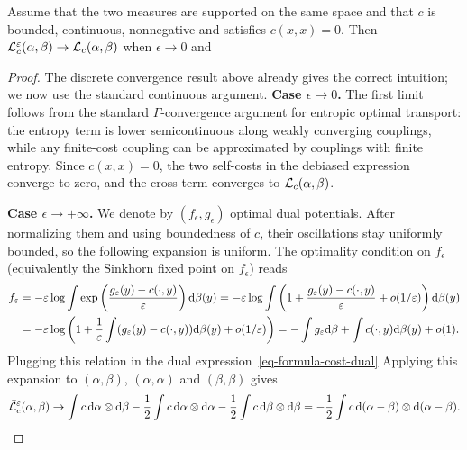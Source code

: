\begin{prop}\label{prop-sinkhorn-divergence-asymptotics}
	Assume that the two measures are supported on the same space and that $c$ is bounded, continuous, nonnegative and satisfies $c(x,x)=0$.
	Then $\bar{\mathcal{L}}_c^\varepsilon(\alpha,\beta) \rightarrow \mathcal{L}_c(\alpha,\beta)$ when $\epsilon\rightarrow 0$ and
\end{prop}
\begin{proof}
	The discrete convergence result above already gives the correct intuition; we now use the standard continuous argument.
	\textbf{Case $\epsilon \rightarrow 0$.}
	The first limit follows from the standard $\Gamma$-convergence argument for entropic optimal transport: the entropy term is lower semicontinuous along weakly converging couplings, while any finite-cost coupling can be approximated by couplings with finite entropy. Since $c(x,x)=0$, the two self-costs in the debiased expression converge to zero, and the cross term converges to $\mathcal{L}_c(\alpha,\beta)$.

	\textbf{Case $\epsilon \rightarrow +\infty$.} We denote by $(f_\epsilon,g_\epsilon)$ optimal dual potentials. After normalizing them and using boundedness of $c$, their oscillations stay uniformly bounded, so the following expansion is uniform. The optimality condition on $f_\epsilon$ (equivalently the Sinkhorn fixed point on $f_\epsilon$) reads
		\begin{align*}
			f_\varepsilon &= -\varepsilon \log \int \exp\left(  \frac{g_\varepsilon(y) - c(\cdot,y)}{\varepsilon}  \right) \mathrm{d} \beta(y)
			=	-\varepsilon \log \int \left(  1 + \frac{g_\varepsilon(y) - c(\cdot,y)}{\varepsilon} + o(1/\varepsilon)  \right) \mathrm{d} \beta(y) \\
			&=	-\varepsilon \log\left( 1+\frac{1}{\varepsilon}\int (g_\varepsilon(y)-c(\cdot,y))\mathrm{d}\beta(y)+o(1/\varepsilon) \right)
			= - \int g_\varepsilon \mathrm{d}\beta + \int c(\cdot,y) \mathrm{d} \beta(y) + o(1).
		\end{align*}
	Plugging this relation in the dual expression~\eqref{eq-formula-cost-dual}
	Applying this expansion to $(\alpha,\beta)$, $(\alpha,\alpha)$ and $(\beta,\beta)$ gives
	\[
		\bar{\mathcal{L}}_c^\varepsilon(\alpha,\beta)
		\to
		\int c\,\mathrm{d}\alpha\otimes\mathrm{d}\beta
		-\frac12\int c\,\mathrm{d}\alpha\otimes\mathrm{d}\alpha
		-\frac12\int c\,\mathrm{d}\beta\otimes\mathrm{d}\beta
		=
		-\frac12\int c\,\mathrm{d}(\alpha-\beta)\otimes\mathrm{d}(\alpha-\beta).
	\]
\end{proof}

